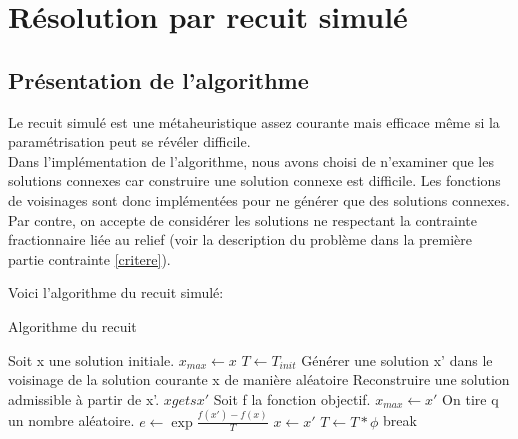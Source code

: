 \documentclass[12pt,a4paper]{article}
\begin{document}
\section{Résolution par recuit simulé}
\subsection{Présentation de l'algorithme}
Le recuit simulé est une métaheuristique assez courante mais efficace même si la paramétrisation peut se révéler difficile.\\
Dans l'implémentation de l'algorithme, nous avons choisi de n'examiner que les solutions connexes car construire une solution connexe est difficile. Les fonctions de voisinages sont donc implémentées pour ne générer que des solutions connexes.\\ 
Par contre, on accepte de considérer les solutions ne respectant la contrainte fractionnaire liée au relief (voir la description du problème dans la première partie contrainte \ref{critere}).

Voici l'algorithme du recuit simulé:
\begin{algorithm}
	\caption{Algorithme du recuit}
	\begin{algorithmic}[1]
		\STATE Soit x une solution initiale.
		\STATE $x_{max} \gets x$
		\STATE $T\gets T_{init}$
		\STATE Générer une solution x' dans le voisinage de la solution courante x de manière aléatoire
		\STATE Reconstruire une solution admissible à partir de x'.
		\STATE $x gets x'$
		\STATE Soit f la fonction objectif.
		\STATE $x_{max} \gets x'$
		\ENDIF
		\ELSE
		\STATE On tire q un nombre aléatoire.
		\STATE $e\gets \exp{\frac{f(x')-f(x)}{T}}$
		\STATE $x \gets x'$
		\ENDIF
		\ENDIF
		\ENDFOR
		\STATE $T\gets T*\phi$
		\STATE break
		\ENDIF
		\ENDFOR
	\end{algorithmic}
\end{algorithm}
\end{document}
